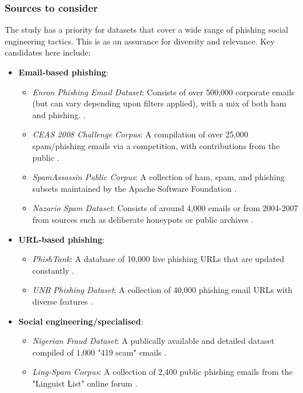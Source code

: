 
\subsubsection*{Sources to consider}
The study has a priority for datasets that cover a wide range of phishing social engineering tactics. This is as an assurance for diversity and relevance. Key candidates here include:

\begin{itemize}
  \item \textbf{Email-based phishing}:
  \begin{itemize}
    \item \textit{Enron Phishing Email Dataset}: Consists of over 500,000 corporate emails (but can vary depending upon filters applied), with a mix of both ham and phishing. \citep{klimt2004enron}.
    \item \textit{CEAS 2008 Challenge Corpus}: A compilation of over 25,000 spam/phishing emails via a competition, with contributions from the public \citep{cormack2008email}.
    \item \textit{SpamAssassin Public Corpus}: A collection of ham, spam, and phishing subsets maintained by the Apache Software Foundation \citep{spamassassin2003}.
    \item \textit{Nazario Spam Dataset}: Consists of around 4,000 emails or from 2004-2007 from sources such as deliberate honeypots or public archives \citep{nazario2007phishing}.
  \end{itemize}
\item \textbf{URL-based phishing}:
\begin{itemize}
  \item \textit{PhishTank}: A database of 10,000 live phishing URLs that are updated constantly \citep{phishTank2023}.
  \item \textit{UNB Phishing Dataset}: A collection of 40,000 phishing email URLs with diverse features \citep{unb2016phishing}.
\end{itemize}
\item \textbf{Social engineering/specialised}:
  \begin{itemize}
    \item \textit{Nigerian Fraud Dataset}: A publically available and detailed dataset compiled of 1,000 "419 scam" emails \citep{champa2024phishing}.
    \item \textit{Ling-Spam Corpus}: A collection of 2,400 public phishing emails from the "Linguist List" online forum \citep{ling2005spam}.
  \end{itemize}
\end{itemize}

